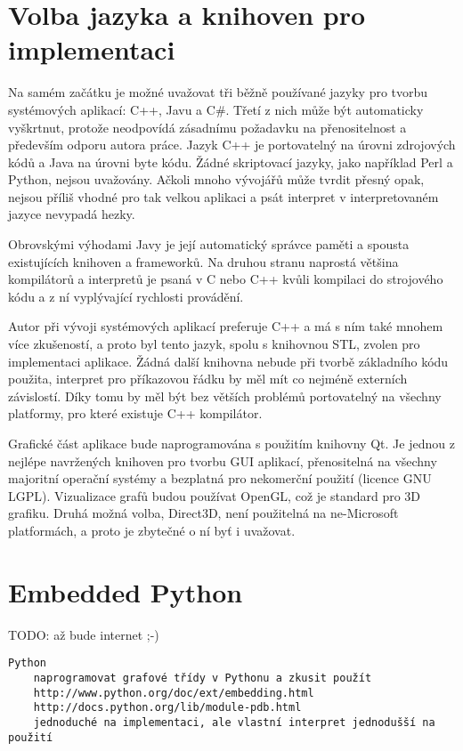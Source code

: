 \documentclass[11pt,twoside,a4paper]{book}
\begin{document}
\section{Volba jazyka a knihoven pro implementaci}

Na samém začátku je možné uvažovat tři běžně používané jazyky pro tvorbu sys\-té\-mo\-vých aplikací: C++, Javu a C\#. Třetí z nich může být automaticky vyškrtnut, protože neodpovídá zásadnímu požadavku na přenositelnost a především odporu autora práce. Jazyk C++ je portovatelný na úrovni zdrojových kódů a Java na úrovni byte kódu. Žádné skriptovací jazyky, jako například Perl a Python, nejsou uvažovány. Ačkoli mnoho vývojářů může tvrdit přesný opak, nejsou příliš vhodné pro tak velkou aplikaci a psát interpret v interpretovaném jazyce nevypadá hezky.

Obrovskými výhodami Javy je její automatický správce paměti a spousta existujících knihoven a frameworků. Na druhou stranu naprostá většina kompilátorů a interpretů je psaná v C nebo C++ kvůli kompilaci do strojového kódu a z ní vyplývající rychlosti provádění.

Autor při vývoji systémových aplikací preferuje C++ a má s ním také mnohem více zkušeností, a proto byl tento jazyk, spolu s knihovnou STL, zvolen pro implementaci aplikace. Žádná další knihovna nebude při tvorbě základního kódu použita, interpret pro příkazovou řádku by měl mít co nejméně externích závislostí. Díky tomu by měl být bez větších problémů portovatelný na všechny platformy, pro které existuje C++ kompilátor.

Grafické část aplikace bude naprogramována s použitím knihovny Qt. Je jednou z nejlépe navržených knihoven pro tvorbu GUI aplikací, přenositelná na všechny majoritní operační systémy a bezplatná pro nekomerční použití (licence GNU LGPL). Vizualizace grafů budou používat OpenGL, což je standard pro 3D grafiku. Druhá možná volba, Direct3D, není použitelná na ne-Microsoft platformách, a proto je zbytečné o ní byť i uvažovat.


\section{Embedded Python}

TODO: až bude internet ;-)

\begin{verbatim}
Python
	naprogramovat grafové třídy v Pythonu a zkusit použít
	http://www.python.org/doc/ext/embedding.html
	http://docs.python.org/lib/module-pdb.html
	jednoduché na implementaci, ale vlastní interpret jednodušší na použití
\end{verbatim}
\end{document}
